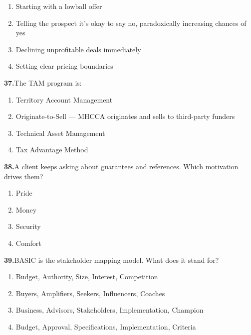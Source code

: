 \documentclass[11pt,letterpaper]{article}
\newif\ifshowsolutions
\newcommand{\answer}[1]{%
  \ifshowsolutions
    \begin{tcolorbox}[colback=green!5!white, colframe=answergreen, title={\small\textbf{Answer}}, fonttitle=\color{white}, coltitle=white, colbacktitle=answergreen, boxrule=0.5pt, arc=2pt, left=4pt, right=4pt, top=2pt, bottom=2pt]
    {\small #1}
    \end{tcolorbox}
  \fi
}
\begin{document}
\begin{enumerate}[label=\Alph*), leftmargin=2em, itemsep=0pt]
\item Starting with a lowball offer
\item Telling the prospect it's okay to say no, paradoxically increasing chances of yes
\item Declining unprofitable deals immediately
\item Setting clear pricing boundaries
\end{enumerate}
\answer{B) Reduces pressure, lowers the Emotional Wall, makes the client more open.}

\vspace{0.5em}

\noindent\textbf{37.}\quad The TAM program is:

\begin{enumerate}[label=\Alph*), leftmargin=2em, itemsep=0pt]
\item Territory Account Management
\item Originate-to-Sell --- MHCCA originates and sells to third-party funders
\item Technical Asset Management
\item Tax Advantage Method
\end{enumerate}
\answer{B) Originate-to-Sell. For deals MHCCA declines. Non-negotiable pricing set by funder. MHCCA earns placement fee.}

\vspace{0.5em}

\noindent\textbf{38.}\quad A client keeps asking about guarantees and references. Which motivation drives them?

\begin{enumerate}[label=\Alph*), leftmargin=2em, itemsep=0pt]
\item Pride
\item Money
\item Security
\item Comfort
\end{enumerate}
\answer{C) Security. 6 motivations: Security, Pride, Novelty, Comfort, Money, Likeability. Emphasize stability and track record.}

\vspace{0.5em}

\noindent\textbf{39.}\quad BASIC is the stakeholder mapping model. What does it stand for?

\begin{enumerate}[label=\Alph*), leftmargin=2em, itemsep=0pt]
\item Budget, Authority, Size, Interest, Competition
\item Buyers, Amplifiers, Seekers, Influencers, Coaches
\item Business, Advisors, Stakeholders, Implementation, Champion
\item Budget, Approval, Specifications, Implementation, Criteria
\end{enumerate}
\answer{B) Buyers, Amplifiers, Seekers, Influencers, Coaches.}
\end{document}
